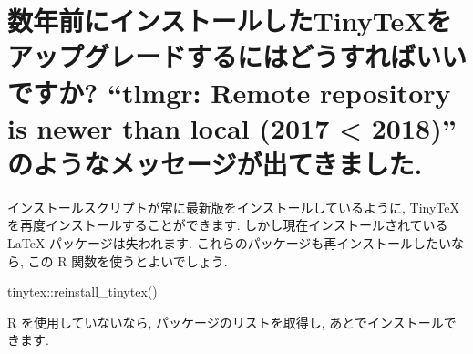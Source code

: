 \documentclass[
  xelatex,ja=standard,jafont=noto]{bxjsreport}
\newenvironment{Shaded}{\begin{snugshade}}{\end{snugshade}}
\newcommand{\AttributeTok}[1]{\textcolor[rgb]{0.77,0.63,0.00}{#1}}
\newcommand{\CommentTok}[1]{\textcolor[rgb]{0.56,0.35,0.01}{\textit{#1}}}
\newcommand{\ExtensionTok}[1]{#1}
\newcommand{\FunctionTok}[1]{\textcolor[rgb]{0.00,0.00,0.00}{#1}}
\newcommand{\KeywordTok}[1]{\textcolor[rgb]{0.13,0.29,0.53}{\textbf{#1}}}
\newcommand{\NormalTok}[1]{#1}
\newcommand{\OperatorTok}[1]{\textcolor[rgb]{0.81,0.36,0.00}{\textbf{#1}}}
\newcommand{\SpecialCharTok}[1]{\textcolor[rgb]{0.00,0.00,0.00}{#1}}
\newcommand{\StringTok}[1]{\textcolor[rgb]{0.31,0.60,0.02}{#1}}
\newcommand{\VariableTok}[1]{\textcolor[rgb]{0.00,0.00,0.00}{#1}}
\begin{document}
\hypertarget{ux6570ux5e74ux524dux306bux30a4ux30f3ux30b9ux30c8ux30fcux30ebux3057ux305ftinytexux3092ux30a2ux30c3ux30d7ux30b0ux30ecux30fcux30c9ux3059ux308bux306bux306fux3069ux3046ux3059ux308cux3070ux3044ux3044ux3067ux3059ux304b-tlmgr-remote-repository-is-newer-than-local-2017-2018-ux306eux3088ux3046ux306aux30e1ux30c3ux30bbux30fcux30b8ux304cux51faux3066ux304dux307eux3057ux305f.}{%
\section{数年前にインストールしたTinyTeXをアップグレードするにはどうすればいいですか?
``tlmgr: Remote repository is newer than local (2017 \textless{} 2018)''
のようなメッセージが出てきました.}\label{ux6570ux5e74ux524dux306bux30a4ux30f3ux30b9ux30c8ux30fcux30ebux3057ux305ftinytexux3092ux30a2ux30c3ux30d7ux30b0ux30ecux30fcux30c9ux3059ux308bux306bux306fux3069ux3046ux3059ux308cux3070ux3044ux3044ux3067ux3059ux304b-tlmgr-remote-repository-is-newer-than-local-2017-2018-ux306eux3088ux3046ux306aux30e1ux30c3ux30bbux30fcux30b8ux304cux51faux3066ux304dux307eux3057ux305f.}}

インストールスクリプトが常に最新版をインストールしているように, TinyTeX
を再度インストールすることができます. しかし現在インストールされている
LaTeX パッケージは失われます.
これらのパッケージも再インストールしたいなら, この R
関数を使うとよいでしょう.

\begin{Shaded}
\begin{Highlighting}[numbers=left,,]
\NormalTok{tinytex}\SpecialCharTok{::}\FunctionTok{reinstall\_tinytex}\NormalTok{()}
\end{Highlighting}
\end{Shaded}

R を使用していないなら, パッケージのリストを取得し,
あとでインストールできます.

\begin{Shaded}
\end{Shaded}
\end{document}
